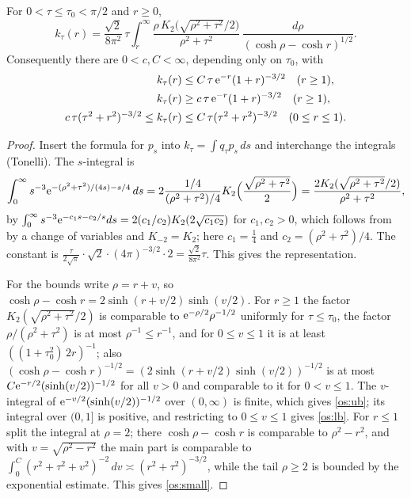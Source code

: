 \begin{lemma}\label{os:poisson}
For $0<\tau\le\tau_0<\pi/2$ and $r\ge0$,
\[
k_\tau(r)=\frac{\sqrt2}{8\pi^2}\,\tau\int_r^\infty\frac{\rho\,K_2\bigl(\sqrt{\rho^2+\tau^2}/2\bigr)}{\rho^2+\tau^2}\,\frac{d\rho}{(\cosh\rho-\cosh r)^{1/2}}.
\]
Consequently there are $0<c,C<\infty$, depending only on $\tau_0$, with
\begin{align}
k_\tau(r)&\le C\,\tau\,\mathrm{e}^{-r}(1+r)^{-3/2}\quad(r\ge1),\label{os:ub}\\
k_\tau(r)&\ge c\,\tau\,\mathrm{e}^{-r}(1+r)^{-3/2}\quad(r\ge1),\label{os:lb}\\
c\,\tau(\tau^2+r^2)^{-3/2}\le k_\tau(r)&\le C\,\tau(\tau^2+r^2)^{-3/2}\quad(0\le r\le1).\label{os:small}
\end{align}
\end{lemma}
\begin{proof}
Insert the formula for $p_s$ into $k_\tau=\int q_\tau p_s\,ds$ and interchange the integrals (Tonelli). The $s$-integral is
\[
\int_0^\infty s^{-3}\mathrm{e}^{-(\rho^2+\tau^2)/(4s)-s/4}\,ds=2\frac{1/4}{(\rho^2+\tau^2)/4}K_2\Bigl(\frac{\sqrt{\rho^2+\tau^2}}2\Bigr)
=\frac{2K_2(\sqrt{\rho^2+\tau^2}/2)}{\rho^2+\tau^2},
\]
by $\int_0^\infty s^{-3}\mathrm{e}^{-c_1s-c_2/s}ds=2(c_1/c_2)K_2(2\sqrt{c_1c_2})$ for $c_1,c_2>0$, which follows from
\cite[10.32.10]{DLMF} by a change of variables and $K_{-2}=K_2$; here $c_1=\tfrac14$ and $c_2=(\rho^2+\tau^2)/4$. The constant is
$\tfrac{\tau}{2\sqrt\pi}\cdot\sqrt2\cdot(4\pi)^{-3/2}\cdot2=\tfrac{\sqrt2}{8\pi^2}\tau$. This gives the representation.

For the bounds write $\rho=r+v$, so $\cosh\rho-\cosh r=2\sinh(r+v/2)\sinh(v/2)$. For $r\ge1$ the factor
$K_2(\sqrt{\rho^2+\tau^2}/2)$ is comparable to $\mathrm{e}^{-\rho/2}\rho^{-1/2}$ uniformly for $\tau\le\tau_0$, the factor $\rho/(\rho^2+\tau^2)$
is at most $\rho^{-1}\le r^{-1}$, and for $0\le v\le1$ it is at least $((1+\tau_0^2)\,2r)^{-1}$; also $(\cosh\rho-\cosh r)^{-1/2}=(2\sinh(r+v/2)\sinh(v/2))^{-1/2}$ is at most $C\mathrm{e}^{-r/2}(\sinh(v/2))^{-1/2}$ for all $v>0$ and comparable to it for $0<v\le1$. The $v$-integral of
$\mathrm{e}^{-v/2}(\sinh(v/2))^{-1/2}$ over $(0,\infty)$ is finite, which gives \eqref{os:ub}; its integral over $(0,1]$ is positive, and restricting to $0\le v\le1$ gives \eqref{os:lb}. For $r\le1$ split the
integral at $\rho=2$; there $\cosh\rho-\cosh r$ is comparable to $\rho^2-r^2$, and with $v=\sqrt{\rho^2-r^2}$ the main part is
comparable to $\int_0^{C}(r^2+\tau^2+v^2)^{-2}\,dv\asymp(r^2+\tau^2)^{-3/2}$, while the tail $\rho\ge2$ is bounded by the
exponential estimate. This gives \eqref{os:small}.
\end{proof}


